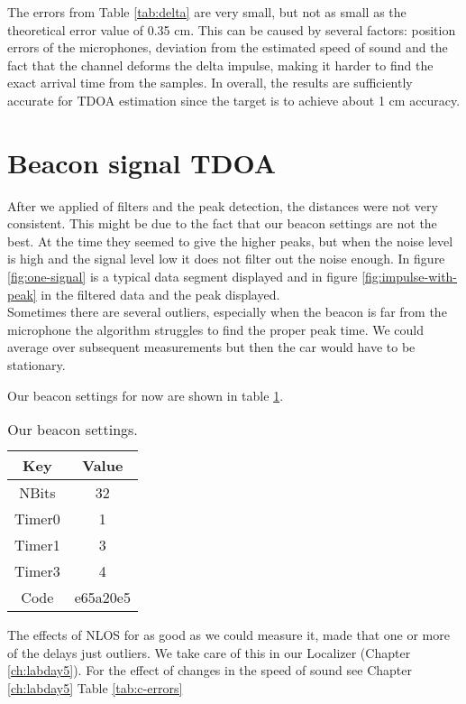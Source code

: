 \documentclass[final]{scrreprt} %
\begin{document}
The errors from Table \ref{tab:delta} are very small, but not as small as the theoretical error value of 0.35 cm.
This can be caused by several factors: position errors of the microphones, deviation from the estimated speed of sound and the fact that the channel deforms the delta impulse, making it harder to find the exact arrival time from the samples.
In overall, the results are sufficiently accurate for TDOA estimation since the target is to achieve about 1 cm accuracy.

\section{Beacon signal TDOA}
After we applied of filters and the peak detection, the distances were not very consistent.
This might be due to the fact that our beacon settings are not the best.
At the time they seemed to give the higher peaks, but when the noise level is high and the signal level low it does not filter out the noise enough.
In figure \ref{fig:one-signal} is a typical data segment displayed and in figure \ref{fig:impulse-with-peak} in the filtered data and the peak displayed.\\
Sometimes there are several outliers, especially when the beacon is far from the microphone the algorithm struggles to find the proper peak time.
We could average over subsequent measurements but then the car would have to be stationary.


Our beacon settings for now are shown in table \ref{tab:beacon-settings}.
\begin{table} [H]
	\centering
	\begin{tabular} { c | c }
	Key & Value \\ \hline
	NBits & 32 \\
	Timer0 & 1 \\
	Timer1 & 3 \\
	Timer3 & 4 \\
	Code & e65a20e5 \\	
	\end{tabular}
\caption{Our beacon settings.}
\label{tab:beacon-settings}
\end{table}
The effects of NLOS for as good as we could measure it, made that one or more of the delays just outliers.
We take care of this in our Localizer (Chapter \ref{ch:labday5}).
For the effect of changes in the speed of sound see Chapter \ref{ch:labday5} Table \ref{tab:c-errors}
\end{document}
